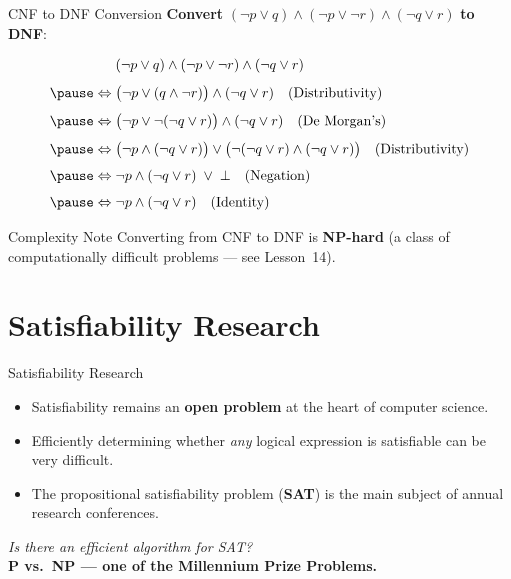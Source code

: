 \documentclass[aspectratio=169]{beamer}
\newcommand{\Iff}{\Leftrightarrow}
\newcommand{\F}{\bot}
\begin{document}
\begin{frame}{CNF to DNF Conversion}
  \textbf{Convert} $(\lnot p \lor q) \land (\lnot p \lor \lnot r)
    \land (\lnot q \lor r)$ \textbf{to DNF}:

  \medskip\small
  \begin{align*}
    & (\lnot p \lor q)
      \land (\lnot p \lor \lnot r)
      \land (\lnot q \lor r) \\[4pt]
    \pause
    \Iff\;
    & \bigl(\lnot p \lor (q \land \lnot r)\bigr)
      \land (\lnot q \lor r)
      \quad\text{(Distributivity)} \\[4pt]
    \pause
    \Iff\;
    & \bigl(\lnot p \lor \lnot(\lnot q \lor r)\bigr)
      \land (\lnot q \lor r)
      \quad\text{(De Morgan's)} \\[4pt]
    \pause
    \Iff\;
    & \bigl(\lnot p \land (\lnot q \lor r)\bigr)
      \lor
      \bigl(\lnot(\lnot q \lor r) \land (\lnot q \lor r)\bigr)
      \quad\text{(Distributivity)} \\[4pt]
    \pause
    \Iff\;
    & \lnot p \land (\lnot q \lor r) \;\lor\; \F
      \quad\text{(Negation)} \\[4pt]
    \pause
    \Iff\;
    & \lnot p \land (\lnot q \lor r)
      \quad\text{(Identity)}
  \end{align*}
  \normalsize

  \pause
  \begin{alertblock}{Complexity Note}
    Converting from CNF to DNF is \textbf{NP-hard}
    (a class of computationally difficult problems — see Lesson~14).
  \end{alertblock}
\end{frame}

\section{Satisfiability Research}

\begin{frame}{Satisfiability Research}
  \begin{itemize}
    \item Satisfiability remains an \textbf{open problem} at the heart of
          computer science.
    \item Efficiently determining whether \emph{any} logical expression is
          satisfiable can be very difficult.
    \item The propositional satisfiability problem (\textbf{SAT}) is the main
          subject of annual research conferences.
  \end{itemize}

  \bigskip
  \begin{center}
    \large
    \textit{Is there an efficient algorithm for SAT?}\\[4pt]
    \textcolor{dmOrange}{\textbf{P vs.\ NP — one of the Millennium Prize Problems.}}
  \end{center}
\end{frame}
\end{document}
